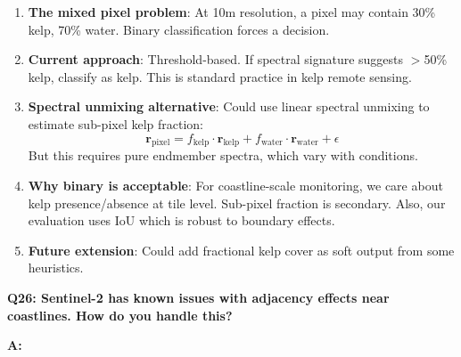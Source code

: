 \documentclass[11pt]{article}
\begin{document}
\begin{enumerate}
    \item \textbf{The mixed pixel problem}: At 10m resolution, a pixel may contain 30\% kelp, 70\% water. Binary classification forces a decision.

    \item \textbf{Current approach}: Threshold-based. If spectral signature suggests $>$50\% kelp, classify as kelp. This is standard practice in kelp remote sensing.

    \item \textbf{Spectral unmixing alternative}: Could use linear spectral unmixing to estimate sub-pixel kelp fraction:
    \[
    \mathbf{r}_{\text{pixel}} = f_{\text{kelp}} \cdot \mathbf{r}_{\text{kelp}} + f_{\text{water}} \cdot \mathbf{r}_{\text{water}} + \epsilon
    \]
    But this requires pure endmember spectra, which vary with conditions.

    \item \textbf{Why binary is acceptable}: For coastline-scale monitoring, we care about kelp presence/absence at tile level. Sub-pixel fraction is secondary. Also, our evaluation uses IoU which is robust to boundary effects.

    \item \textbf{Future extension}: Could add fractional kelp cover as soft output from some heuristics.
\end{enumerate}

\textbf{Q26: Sentinel-2 has known issues with adjacency effects near coastlines. How do you handle this?}

\textbf{A:}
\end{document}
